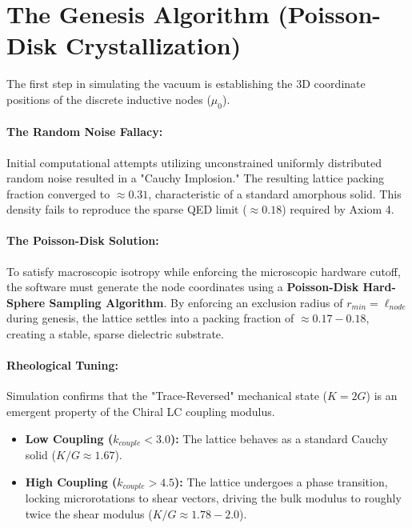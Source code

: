 \section{The Genesis Algorithm (Poisson-Disk Crystallization)}
The first step in simulating the vacuum is establishing the 3D coordinate positions of the discrete inductive nodes ($\mu_0$).

\paragraph{The Random Noise Fallacy:} Initial computational attempts utilizing unconstrained uniformly distributed random noise resulted in a "Cauchy Implosion." The resulting lattice packing fraction converged to $\approx 0.31$, characteristic of a standard amorphous solid. This density fails to reproduce the sparse QED limit ($\approx 0.18$) required by Axiom 4.

\paragraph{The Poisson-Disk Solution:} To satisfy macroscopic isotropy while enforcing the microscopic hardware cutoff, the software must generate the node coordinates using a \textbf{Poisson-Disk Hard-Sphere Sampling Algorithm}. By enforcing an exclusion radius of $r_{min} = \ell_{node}$ during genesis, the lattice settles into a packing fraction of $\approx 0.17-0.18$, creating a stable, sparse dielectric substrate.

\paragraph{Rheological Tuning:} Simulation confirms that the "Trace-Reversed" mechanical state ($K=2G$) is an emergent property of the Chiral LC coupling modulus.
\begin{itemize}
    \item \textbf{Low Coupling ($k_{couple} < 3.0$):} The lattice behaves as a standard Cauchy solid ($K/G \approx 1.67$).
    \item \textbf{High Coupling ($k_{couple} > 4.5$):} The lattice undergoes a phase transition, locking microrotations to shear vectors, driving the bulk modulus to roughly twice the shear modulus ($K/G \approx 1.78 - 2.0$).
\end{itemize}

